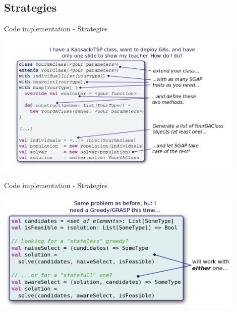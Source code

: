 \documentclass{beamer}
\begin{document}
\subsection{Strategies}
\begin{frame}{Code implementation - Strategies}
  \begin{center}
    \includegraphics[width=0.9\textwidth]{images/real-code}
  \end{center}
\end{frame}


\begin{frame}{Code implementation - Strategies}
  \begin{center}
    \includegraphics[width=0.9\textwidth]{images/real-code-greedy}
  \end{center}
\end{frame}



\end{document}
